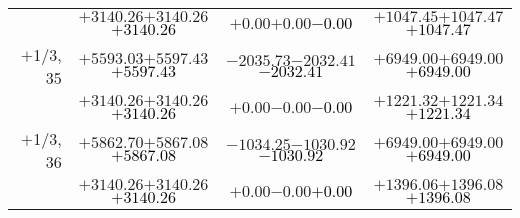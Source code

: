 \documentclass[compress]{beamer}
\begin{document}
\begin{frame}
{\begin{tabular}{r | c | c | c}
           & $+3140.26$\hspace{0.1 cm}$+3140.26$\hspace{0.1 cm}\textcolor{black}{$+3140.26$} & $+0.00$\hspace{0.1 cm}$+0.00$\hspace{0.1 cm}\textcolor{black}{$-0.00$} & $+1047.45$\hspace{0.1 cm}$+1047.47$\hspace{0.1 cm}\textcolor{black}{$+1047.47$} \\
$+$1/3, 35 & $+5593.03$\hspace{0.1 cm}$+5597.43$\hspace{0.1 cm}\textcolor{black}{$+5597.43$} & $-2035.73$\hspace{0.1 cm}$-2032.41$\hspace{0.1 cm}\textcolor{black}{$-2032.41$} & $+6949.00$\hspace{0.1 cm}$+6949.00$\hspace{0.1 cm}\textcolor{black}{$+6949.00$} \\
           & $+3140.26$\hspace{0.1 cm}$+3140.26$\hspace{0.1 cm}\textcolor{black}{$+3140.26$} & $+0.00$\hspace{0.1 cm}$-0.00$\hspace{0.1 cm}\textcolor{black}{$-0.00$} & $+1221.32$\hspace{0.1 cm}$+1221.34$\hspace{0.1 cm}\textcolor{black}{$+1221.34$} \\
$+$1/3, 36 & $+5862.70$\hspace{0.1 cm}$+5867.08$\hspace{0.1 cm}\textcolor{black}{$+5867.08$} & $-1034.25$\hspace{0.1 cm}$-1030.92$\hspace{0.1 cm}\textcolor{black}{$-1030.92$} & $+6949.00$\hspace{0.1 cm}$+6949.00$\hspace{0.1 cm}\textcolor{black}{$+6949.00$} \\
           & $+3140.26$\hspace{0.1 cm}$+3140.26$\hspace{0.1 cm}\textcolor{black}{$+3140.26$} & $+0.00$\hspace{0.1 cm}$-0.00$\hspace{0.1 cm}\textcolor{black}{$+0.00$} & $+1396.06$\hspace{0.1 cm}$+1396.08$\hspace{0.1 cm}\textcolor{black}{$+1396.08$} \\
\end{tabular}}
\end{frame}
\end{document}
